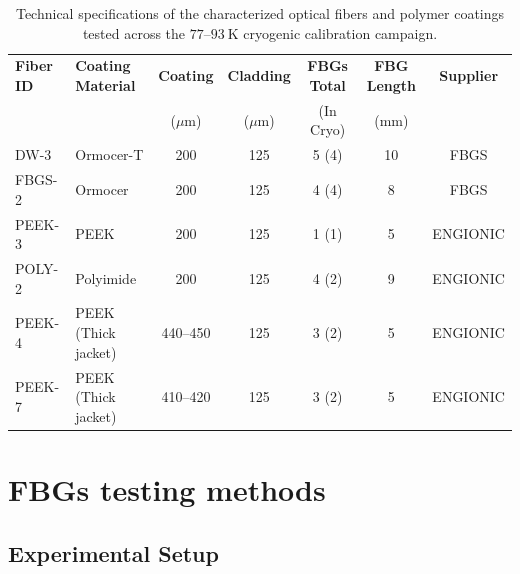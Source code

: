 \documentclass[12pt]{article}
\begin{document}
\begin{table}[htpb]
    \centering
    \scriptsize
    \setlength{\tabcolsep}{4pt}
    \caption{Technical specifications of the characterized optical fibers and polymer coatings tested across the $77$--$93~\text{K}$ cryogenic calibration campaign.}
    \label{tab:fiber_specs}
    \begin{tabular}{llccccc}
        \toprule
        \textbf{Fiber ID} & \textbf{Coating Material} & \textbf{Coating} & \textbf{Cladding} & \textbf{FBGs Total} & \textbf{FBG Length} & \textbf{Supplier} \\
                          &                            & ($\mu\text{m}$)  & ($\mu\text{m}$)   & (In Cryo)           & (mm)                &                   \\
        \midrule
        DW-3              & Ormocer-T                  & 200              & 125               & 5 (4)               & 10                  & FBGS              \\
        FBGS-2            & Ormocer                    & 200              & 125               & 4 (4)               & 8                   & FBGS              \\
        PEEK-3            & PEEK                       & 200              & 125               & 1 (1)               & 5                   & ENGIONIC          \\
        POLY-2            & Polyimide                  & 200              & 125               & 4 (2)               & 9                   & ENGIONIC          \\
        PEEK-4            & PEEK (Thick jacket)        & 440--450         & 125               & 3 (2)               & 5                   & ENGIONIC          \\
        PEEK-7            & PEEK (Thick jacket)        & 410--420         & 125               & 3 (2)               & 5                   & ENGIONIC          \\
        \bottomrule
    \end{tabular}
\end{table}


\section{FBGs testing methods}
\label{sec:setup}

\subsection{Experimental Setup}
\label{subsec:setup}
\end{document}
